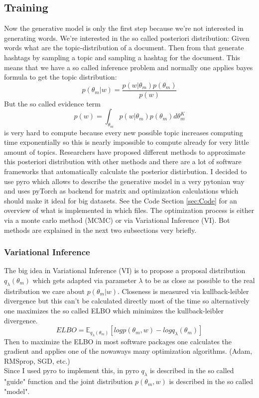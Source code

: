 \documentclass[10pt,conference,compsocconf]{IEEEtran}
\begin{document}
\subsection{Training}
Now the generative model is only the first step because we're not interested in generating words. We're interested in the so called posteriori distribution: Given words what are the topic-distribution of a document. Then from that generate hashtags by sampling a topic and sampling a hashtag for the document. This means that we have a so called inference problem and normally one applies bayes formula to get the topic distribution: \[ p(\theta_m | w) = \frac{p(w | \theta_m)p(\theta_m)}{p(w)} \] But the so called evidence term \[p(w) = \int_{\theta_m} p(w | \theta_m)p(\theta_m) d\theta_m^K \] is very hard to compute because every new possible topic increases computing time exponentially so this is nearly impossible to compute already for very little amount of topics. 
Researchers have proposed different methods to approximate this posteriori distribution with other methods and there are a lot of software frameworks that automatically calculate the posterior distirbution. I decided to use pyro \cite{bingham2018pyro} which allows to describe the generative model in a very pytonian way and uses pyTorch \cite{paszke2017automatic} as backend for matrix and optimization calculations which should make it ideal for big datasets. See the Code Section \ref{sec:Code} for an overview of what is implemented in which files.   The optimization process is either via a monte carlo method (MCMC) or via Variational Inference (VI). Bot methods are explained in the next two subsections very briefly. 

\subsubsection{Variational Inference}
The big idea in Variational Inference (VI) is to propose a proposal distribution $q_\lambda(\theta_m)$ which gets adapted via parameter $\lambda$ to be as close as possible to the real distribution we care about $p(\theta_m | w)$. Closeness is measured via kullback-leibler divergence but this can't be calculated directly most of the time so alternatively one maximizes the so called ELBO which minimizes the kullback-leibler divergence. 
\[ ELBO = \mathbb{E}_{q_\lambda(\theta_m)} [log p(\theta_m, w) - log q_{\lambda}(\theta_m)] \]
Then to maximize the ELBO in most software packages one calculates the gradient and applies one of the nowaways many optimization algorithms. (Adam, RMSprop, SGD, etc.)\\
Since I used pyro to implement this, in pyro $q_\lambda$ is described in the so called "guide" function and the joint distribution $p(\theta_m, w)$ is described in the so called "model". 
\end{document}
